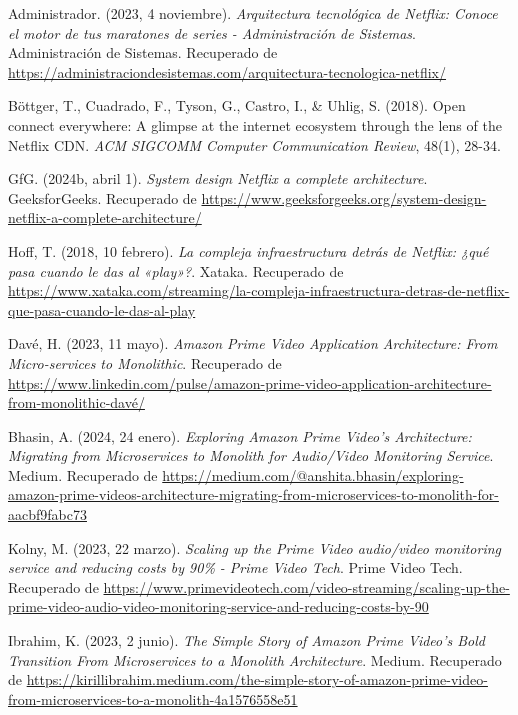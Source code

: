 \documentclass[12pt,a4paper]{article}
\begin{document}
\begin{thebibliography}{99}

Administrador. (2023, 4 noviembre). \textit{Arquitectura tecnológica de Netflix: Conoce el motor de tus maratones de series - Administración de Sistemas}. Administración de Sistemas. Recuperado de \url{https://administraciondesistemas.com/arquitectura-tecnologica-netflix/}

Böttger, T., Cuadrado, F., Tyson, G., Castro, I., \& Uhlig, S. (2018). Open connect everywhere: A glimpse at the internet ecosystem through the lens of the Netflix CDN. \textit{ACM SIGCOMM Computer Communication Review}, 48(1), 28-34.

GfG. (2024b, abril 1). \textit{System design Netflix a complete architecture}. GeeksforGeeks. Recuperado de \url{https://www.geeksforgeeks.org/system-design-netflix-a-complete-architecture/}

Hoff, T. (2018, 10 febrero). \textit{La compleja infraestructura detrás de Netflix: ¿qué pasa cuando le das al «play»?}. Xataka. Recuperado de \url{https://www.xataka.com/streaming/la-compleja-infraestructura-detras-de-netflix-que-pasa-cuando-le-das-al-play}

Davé, H. (2023, 11 mayo). \textit{Amazon Prime Video Application Architecture: From Micro-services to Monolithic}. Recuperado de \url{https://www.linkedin.com/pulse/amazon-prime-video-application-architecture-from-monolithic-davé/}

Bhasin, A. (2024, 24 enero). \textit{Exploring Amazon Prime Video’s Architecture: Migrating from Microservices to Monolith for Audio/Video Monitoring Service}. Medium. Recuperado de \url{https://medium.com/@anshita.bhasin/exploring-amazon-prime-videos-architecture-migrating-from-microservices-to-monolith-for-aacbf9fabc73}

Kolny, M. (2023, 22 marzo). \textit{Scaling up the Prime Video audio/video monitoring service and reducing costs by 90\% - Prime Video Tech}. Prime Video Tech. Recuperado de \url{https://www.primevideotech.com/video-streaming/scaling-up-the-prime-video-audio-video-monitoring-service-and-reducing-costs-by-90}

Ibrahim, K. (2023, 2 junio). \textit{The Simple Story of Amazon Prime Video’s Bold Transition From Microservices to a Monolith Architecture}. Medium. Recuperado de \url{https://kirillibrahim.medium.com/the-simple-story-of-amazon-prime-video-from-microservices-to-a-monolith-4a1576558e51}


\end{thebibliography}
\end{document}

